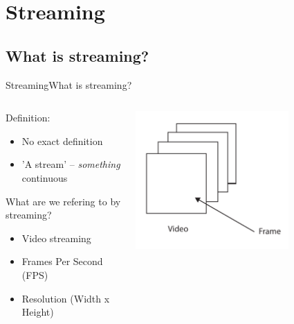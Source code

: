 \author{Thomas K. Panum}
\section{Streaming}
\subsection{What is streaming?}
\begin{frame}{Streaming}{What is streaming?}
  \begin{columns}[T]
    \begin{column}{.6\textwidth}
     \begin{block}{}
    Definition:
    \begin{itemize}
      \item No exact definition
      \item 'A stream' -- \textit{something} continuous
    \end{itemize}
    What are we refering to by streaming?
    \begin{itemize}
      \item Video streaming
      \item Frames Per Second (FPS)
      \item Resolution (Width x Height)
    \end{itemize}
    \end{block}
    \end{column}
    \begin{column}{.4\textwidth}
      \begin{block}{}
        \begin{center}
          \includegraphics[width=0.7\textwidth]{images/video_structure.pdf}
        \end{center}
      \end{block}
    \end{column}
  \end{columns}
\end{frame}

